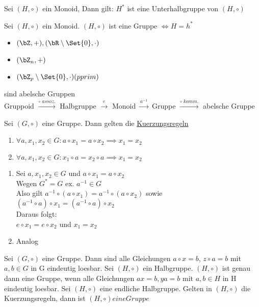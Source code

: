 Sei $(H, \circ)$ ein Monoid, Dann gilt:
$H^*$ ist eine Unterhalbgruppe von $(H, \circ)$



Sei $(H, \circ)$ ein Monoid. $(H, \circ)$ ist eine Gruppe $\iff H = h^*$

\begin{itemize}
\item $(\bZ, +), (\bR \setminus \Set{0}, \cdot)$
\item $(\bZ_n, +)$
\item $(\bZ_p \setminus \Set{0}, \cdot) (p prim)$
\end{itemize}
sind abelsche Gruppen\\

Gruppoid $\overset{\circ\; assoz.}{\rightarrow}$ Halbgruppe $\overset{e}{\rightarrow}$ Monoid $\overset{a^{-1}}{\rightarrow}$ Gruppe $\overset{\circ\; komm.}{\rightarrow}$ abelsche Gruppe

Sei $(G, \circ)$ eine Gruppe. Dann gelten die \underline{Kuerzungsregeln}
\begin{enumerate}
\item $\forall a, x_1, x_2 \in G: a \circ x_1 = a \circ x_2 \implies x_1 = x_2$
\item $\forall a, x_1, x_2 \in G: x_1 \circ a = x_2 \circ a \implies x_1 = x_2$
\end{enumerate}
\begin{enumerate}
\item Sei $a, x_1, x_2 \in G$ und $a \circ x_1 = a \circ x_2$\\
Wegen $G^* = G \text{ ex. } a^{-1} \in G$\\
Also gilt $a^{-1} \circ (a \circ x_1) = a^{-1} \circ (a \circ x_2)$ sowie\\
$(a^{-1} \circ a) \circ x_1 = (a^{-1} \circ a) \circ x_2$\\
Daraus folgt:\\
$e \circ x_1 = e \circ x_2$ und $x_1 = x_2$
\item Analog
\end{enumerate}
Sei $(G, \circ)$ eine Gruppe. Dann sind alle Gleichungen $a \circ x = b$, $z \circ a = b$ mit $a, b \in G$
in G eindeutig loesbar.
Sei $(H, \circ)$ ein Halbgruppe. $(H, \circ)$ ist genau dann eine Gruppe, wenn alle Gleichungen
$ax = b, ya =b$ mit $a, b \in H$ in H eindeutig loesbar.
Sei $(H, \circ)$ eine endliche Halbgruppe. Gelten in $(H, \circ)$ die Kuerzungsregeln, dann ist $(H, \circ) eine Gruppe$


